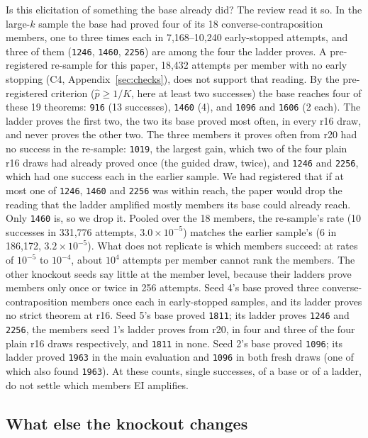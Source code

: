 Is this elicitation of something the base already did? The review read it so. In the large-$k$ sample the base had
proved four of its 18 converse-contraposition members, one to three times each in 7,168--10,240 early-stopped attempts,
and three of them (\texttt{1246}, \texttt{1460}, \texttt{2256}) are among the four the ladder proves. A pre-registered
re-sample for this paper, 18,432 attempts per member with no early stopping (C4, Appendix~\ref{sec:checks}), does not
support that reading. By the pre-registered criterion ($\hat p \geq 1/K$, here at least two successes) the base reaches
four of these 19 theorems: \texttt{916} (13 successes), \texttt{1460} (4), and \texttt{1096} and \texttt{1606} (2 each).
The ladder proves the first two, the two its base proved most often, in every r16 draw, and never proves the other two.
The three members it proves often from r20 had no success in the re-sample: \texttt{1019}, the largest gain, which \rv{} two
of the four plain r16 draws had already proved once (the guided draw, twice), and \texttt{1246} and \texttt{2256}, which had one success each in the
earlier sample. We had registered that if at most one of \texttt{1246}, \texttt{1460} and
\texttt{2256} was within reach, the paper would drop the reading that the ladder amplified mostly members its base could
already reach. Only \texttt{1460} is, so we drop it. Pooled over the 18 members, the re-sample's rate (10 successes in
331,776 attempts, $3.0\times10^{-5}$) matches the earlier sample's (6 in 186,172, $3.2\times10^{-5}$). What does not
replicate is which members succeed: at rates of $10^{-5}$ to $10^{-4}$, about $10^4$ attempts per member cannot rank
the members. The other knockout seeds say little at the member level, because their ladders prove members only once or twice in
256 attempts. Seed 4's base proved three converse-contraposition members once each in early-stopped samples, and its
ladder proves no strict theorem at r16. Seed 5's base proved \texttt{1811}; its ladder proves \texttt{1246} and
\texttt{2256}, the members seed 1's ladder proves from r20, \rv{} in four and three of the four plain r16 draws respectively, and
\texttt{1811} in none. Seed
2's base proved \texttt{1096}; its ladder proved \texttt{1963} in the main evaluation and \texttt{1096} in both fresh
draws (one of which also found \texttt{1963}).
At these counts, single successes, of a base or of a ladder, do not settle which members EI amplifies.

\subsection{What else the knockout changes}
\label{sec:side}

